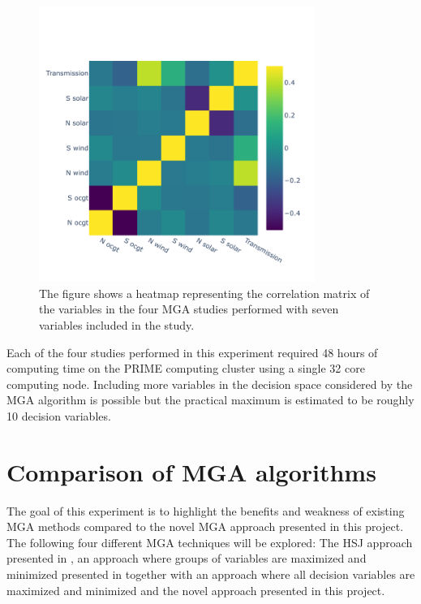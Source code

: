 \begin{figure}[h]\centerfloat
	\includegraphics[width=0.8\textwidth,trim={0 .5cm 0 2cm},clip]{./Images/7D_study_corr}
	\caption{The figure shows a heatmap representing the correlation matrix of the variables in the four MGA studies performed with seven variables included in the study.}
	\label{fig:7d_corr}
\end{figure}

Each of the four studies performed in this experiment required 48 hours of computing time on the PRIME computing cluster \cite{Prime} using a single 32 core computing node. Including more variables in the decision space considered by the MGA algorithm is possible but the practical maximum is estimated to be roughly 10 decision variables.  

\section{Comparison of MGA algorithms}\label{sec:MGA_comparisons}
The goal of this experiment is to highlight the benefits and weakness of existing MGA methods compared to the novel MGA approach presented in this project. The following four different MGA techniques will be explored: The HSJ approach presented in \cite{DeCarolis_MGA}, an approach where groups of variables are maximized and minimized presented in \cite{Fabian_MGA} together with an approach where all decision variables are maximized and minimized and the novel approach presented in this project. 

